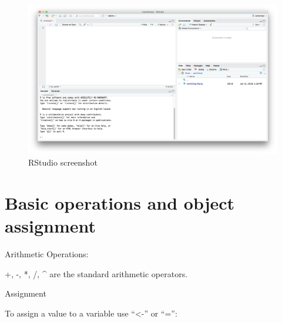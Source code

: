 \documentclass[]{book}
\begin{document}
\begin{figure}
\includegraphics[width=1\linewidth]{RStudioscreenshot} \caption{RStudio screenshot}\label{fig:Rstudioscreenshot}
\end{figure}

\hypertarget{basic-operations-and-object-assignment}{%
\section{Basic operations and object assignment}\label{basic-operations-and-object-assignment}}

Arithmetic Operations:

+, -, *, /, \^{} are the standard arithmetic operators.

Assignment

To assign a value to a variable use ``\textless-'' or ``='':
\end{document}
